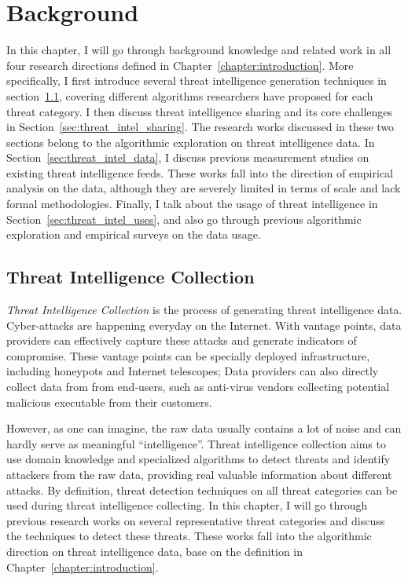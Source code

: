 \chapter{Background}
\label{chapter:background}

In this chapter, I will go through background knowledge and related work
in all four research directions defined in Chapter~\ref{chapter:introduction}.
More specifically, I first introduce several threat intelligence 
generation techniques in section~\ref{sec:threat_intel_generation}, covering 
different algorithms researchers have proposed for each threat category. I
then discuss threat intelligence sharing and its core challenges in 
Section~\ref{sec:threat_intel_sharing}. The research works discussed in these
two sections belong to the algorithmic exploration on threat intelligence data. 
In Section~\ref{sec:threat_intel_data}, I discuss previous measurement studies
on existing threat intelligence feeds. These works fall into the direction of 
empirical analysis on the data, although they are severely limited in terms of 
scale and lack formal methodologies. Finally, I talk about the usage of threat 
intelligence in Section~\ref{sec:threat_intel_uses}, and also go through 
previous algorithmic exploration and empirical surveys on the data usage.

\section{Threat Intelligence Collection}
\label{sec:threat_intel_generation}

\textit{Threat Intelligence Collection} is the process of generating threat 
intelligence data. Cyber-attacks are happening everyday on the Internet.
With vantage points, data providers can effectively capture these attacks 
and generate indicators of compromise. These vantage points can be specially
deployed infrastructure, including honeypots and Internet telescopes; Data
providers can also directly collect data from from end-users, such as 
anti-virus vendors collecting potential malicious executable from their
customers. 

However, as one can imagine, the raw data usually contains a lot of noise 
and can hardly serve as meaningful ``intelligence''. Threat intelligence 
collection aims to use domain knowledge and specialized algorithms to detect 
threats and identify attackers from the raw data, providing real valuable 
information about different attacks. By definition, threat detection
techniques on all threat categories can be used during threat intelligence 
collecting. In this chapter, I will go through previous research works
on several representative threat categories and discuss the techniques to 
detect these threats. These works fall into the algorithmic direction on
threat intelligence data, base on the definition in 
Chapter~\ref{chapter:introduction}.

